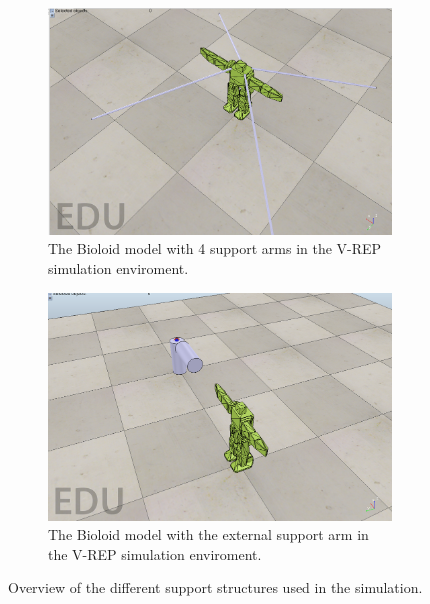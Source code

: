 \begin{figure}
\centering
\begin{subfigure}{0.5\textwidth}
    \includegraphics[scale=0.20]{include/figure/4rods.png}
    \caption{The Bioloid model with 4 support arms in the V-REP simulation enviroment.}
    \label{fig:4rods}
    \end{subfigure}
    \begin{subfigure}{0.5\textwidth}
    \includegraphics[scale=0.20]{include/figure/supportArm.png}
    \caption{The Bioloid model with the external support arm in the V-REP simulation enviroment.}
    \label{fig:supportArm}
    \end{subfigure}
    \caption{Overview of the different support structures used in the simulation.}
\end{figure}